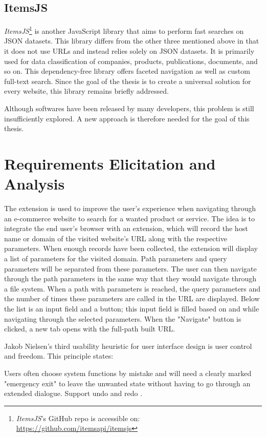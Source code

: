 \subsection*{ItemsJS}
\emph{ItemsJS}\footnote{\emph{ItemsJS}'s GitHub repo is accessible on: \url{https://github.com/itemsapi/itemsjs}} is another JavaScript library that aims to perform fast searches on JSON datasets. This library differs from the other three mentioned above in that it does not use URLs and instead relies solely on JSON datasets. It is primarily used for data classification of companies, products, publications, documents, and so on. This dependency-free library offers faceted navigation as well as custom full-text search. Since the goal of the thesis is to create a universal solution for every website, this library remains briefly addressed.

Although softwares have been released by many developers, this problem is still insufficiently explored. A new approach is therefore needed for the goal of this thesis.

\section{Requirements Elicitation and Analysis}
\label{requirements_analysis}
The extension is used to improve the user's experience when navigating through an e-commerce website to search for a wanted product or service. The idea is to integrate the end user's browser with an extension, which will record the host name or domain of the visited website's URL along with the respective parameters. When enough records have been collected, the extension will display a list of parameters for the visited domain. Path parameters and query parameters will be separated from these parameters. The user can then navigate through the path parameters in the same way that they would navigate through a file system. When a path with parameters is reached, the query parameters and the number of times these parameters are called in the URL are displayed. Below the list is an input field and a button; this input field is filled based on and while navigating through the selected parameters. When the "Navigate" button is clicked, a new tab opens with the full-path built URL.

Jakob Nielsen's third usability heuristic for user interface design is user control and freedom. This principle states:

\begin{displayquote}
  Users often choose system functions by mistake and will need a clearly marked "emergency exit" to leave the unwanted state without having to go through an extended dialogue. Support undo and redo \autocite{nielsen1994usability}.
\end{displayquote}

